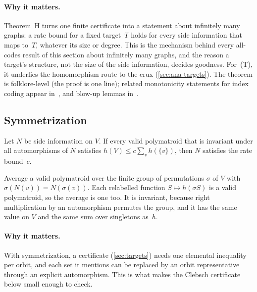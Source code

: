 \paragraph{Why it matters.} Theorem~H turns one finite certificate into a statement about infinitely many graphs: a rate
bound for a fixed target~$T$ holds for every side information that maps to~$T$, whatever its size or degree. This is the
mechanism behind every all-codes result of this section about infinitely many graphs, and
the reason a target's structure, not the size of the side
information, decides goodness. For~(T), it underlies the homomorphism route to the crux (\cref{sec:ana-targets}). The
theorem is folklore-level (the proof is one line); related monotonicity statements
for index coding appear in~\cite{EbrahimiSiavoshani2014}, and blow-up lemmas in~\cite{Baber2017,CameronDangRiis2016}.

\subsection{Symmetrization}\label{sec:symmetrization}

\begin{theorem}[Symmetrization]\label{thm:symmetrization}
Let $N$ be side information on $V$. If every valid polymatroid that is invariant under all automorphisms of $N$ satisfies
$h(V)\le c\sum_vh(\{v\})$, then $N$ satisfies the rate bound~$c$.
\end{theorem}

\begin{outline}
Average a valid polymatroid over the finite group of permutations $\sigma$ of $V$ with $\sigma(N(v))=N(\sigma(v))$. Each
relabelled function $S\mapsto h(\sigma S)$ is a valid polymatroid, so the average is one too. It is invariant, because
right multiplication by an automorphism permutes the group, and it has the same value on $V$ and the same sum over
singletons as~$h$.
\end{outline}

\paragraph{Why it matters.} With symmetrization, a certificate (\cref{sec:targets}) needs one elemental inequality per orbit, and each set it
mentions can be replaced by an
orbit representative through an explicit automorphism. This is what makes the Clebsch certificate below small enough to
check.

